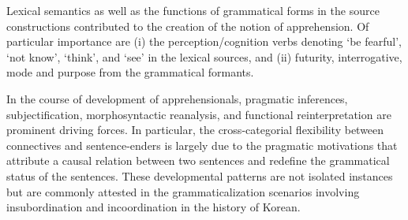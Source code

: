 \documentclass[output=paper,colorlinks,citecolor=brown]{langscibook}
\begin{document}
Lexical semantics as well as the functions of grammatical forms in the source constructions contributed to the creation of the notion of apprehension. Of particular importance are (i) the perception/cognition verbs denoting `be fearful', `not know', `think', and `see' in the lexical sources, and (ii) futurity, interrogative, mode and purpose from the grammatical formants.

In the course of development of apprehensionals, pragmatic inferences, subjectification, morphosyntactic reanalysis, and functional reinterpretation are prominent driving forces. In particular, the cross-categorial flexibility between connectives and sentence-enders is largely due to the pragmatic motivations that attribute a causal relation between two sentences and redefine the grammatical status of the sentences. These developmental patterns are not isolated instances but are commonly attested in the grammaticalization scenarios involving insubordination and incoordination in the history of Korean. 
\end{document}
